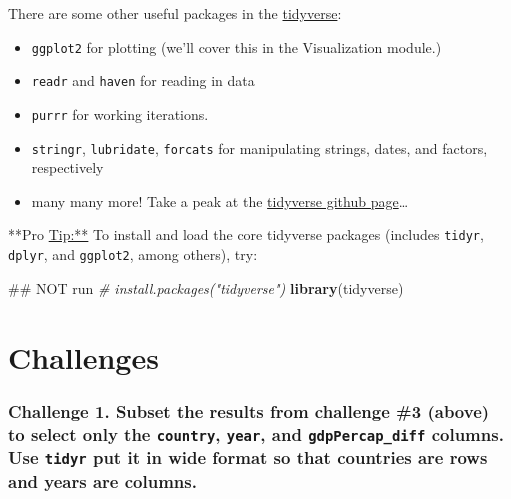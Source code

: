 \documentclass[]{book}
\newenvironment{Shaded}{\begin{snugshade}}{\end{snugshade}}
\newcommand{\KeywordTok}[1]{\textcolor[rgb]{0.13,0.29,0.53}{\textbf{#1}}}
\newcommand{\CommentTok}[1]{\textcolor[rgb]{0.56,0.35,0.01}{\textit{#1}}}
\newcommand{\NormalTok}[1]{#1}
\providecommand{\tightlist}{%
  \setlength{\itemsep}{0pt}\setlength{\parskip}{0pt}}
\begin{document}
There are some other useful packages in the
\href{http://www.tidyverse.org}{tidyverse}:

\begin{itemize}
\tightlist
\item
  \texttt{ggplot2} for plotting (we'll cover this in the Visualization
  module.)
\item
  \texttt{readr} and \texttt{haven} for reading in data
\item
  \texttt{purrr} for working iterations.
\item
  \texttt{stringr}, \texttt{lubridate}, \texttt{forcats} for
  manipulating strings, dates, and factors, respectively
\item
  many many more! Take a peak at the
  \href{https://github.com/tidyverse}{tidyverse github page}\ldots{}
\end{itemize}

**Pro \url{Tip:**} To install and load the core tidyverse packages
(includes \texttt{tidyr}, \texttt{dplyr}, and \texttt{ggplot2}, among
others), try:

\begin{Shaded}
\begin{Highlighting}[]
\NormalTok{## NOT run}
\CommentTok{# install.packages("tidyverse")}
\KeywordTok{library}\NormalTok{(tidyverse)}
\end{Highlighting}
\end{Shaded}

\section{Challenges}\label{challenges-12}

\subsubsection*{\texorpdfstring{Challenge 1. Subset the results from
challenge \#3 (above) to select only the \texttt{country},
\texttt{year}, and \texttt{gdpPercap\_diff} columns. Use \texttt{tidyr}
put it in wide format so that countries are rows and years are
columns.}{Challenge 1. Subset the results from challenge \#3 (above) to select only the country, year, and gdpPercap\_diff columns. Use tidyr put it in wide format so that countries are rows and years are columns.}}\label{challenge-1.-subset-the-results-from-challenge-3-above-to-select-only-the-country-year-and-gdppercap_diff-columns.-use-tidyr-put-it-in-wide-format-so-that-countries-are-rows-and-years-are-columns.}
\end{document}
